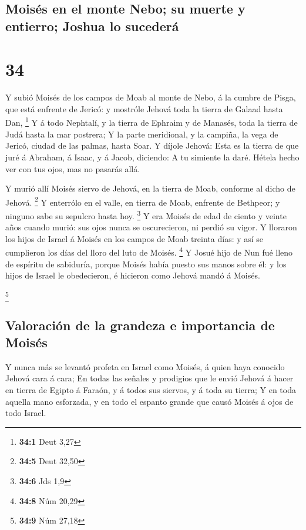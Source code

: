 \hypertarget{moisuxe9s-en-el-monte-nebo-su-muerte-y-entierro-joshua-lo-sucederuxe1}{%
\subsection{Moisés en el monte Nebo; su muerte y entierro; Joshua lo
sucederá}\label{moisuxe9s-en-el-monte-nebo-su-muerte-y-entierro-joshua-lo-sucederuxe1}}

\hypertarget{section-33}{%
\section{34}\label{section-33}}

 Y subió Moisés de los campos de Moab al monte de Nebo, á
la cumbre de Pisga, que está enfrente de Jericó: y mostróle Jehová toda
la tierra de Galaad hasta Dan, \footnote{\textbf{34:1} Deut 3,27}
 Y á todo Nephtalí, y la tierra de Ephraim y de Manasés,
toda la tierra de Judá hasta la mar postrera;  Y la parte
meridional, y la campiña, la vega de Jericó, ciudad de las palmas, hasta
Soar.  Y díjole Jehová: Esta es la tierra de que juré á
Abraham, á Isaac, y á Jacob, diciendo: A tu simiente la daré. Hétela
hecho ver con tus ojos, mas no pasarás allá.

 Y murió allí Moisés siervo de Jehová, en la tierra de
Moab, conforme al dicho de Jehová. \footnote{\textbf{34:5} Deut 32,50}
 Y enterrólo en el valle, en tierra de Moab, enfrente de
Bethpeor; y ninguno sabe su sepulcro hasta hoy. \footnote{\textbf{34:6}
  Jds 1,9}  Y era Moisés de edad de ciento y veinte años
cuando murió: sus ojos nunca se oscurecieron, ni perdió su vigor.
 Y lloraron los hijos de Israel á Moisés en los campos de
Moab treinta días: y así se cumplieron los días del lloro del luto de
Moisés. \footnote{\textbf{34:8} Núm 20,29}  Y Josué hijo
de Nun fué lleno de espíritu de sabiduría, porque Moisés había puesto
sus manos sobre él: y los hijos de Israel le obedecieron, é hicieron
como Jehová mandó á Moisés.

\footnote{\textbf{34:9} Núm 27,18}

\hypertarget{valoraciuxf3n-de-la-grandeza-e-importancia-de-moisuxe9s}{%
\subsection{Valoración de la grandeza e importancia de
Moisés}\label{valoraciuxf3n-de-la-grandeza-e-importancia-de-moisuxe9s}}

 Y nunca más se levantó profeta en Israel como Moisés, á
quien haya conocido Jehová cara á cara;  En todas las
señales y prodigios que le envió Jehová á hacer en tierra de Egipto á
Faraón, y á todos sus siervos, y á toda su tierra;  Y en
toda aquella mano esforzada, y en todo el espanto grande que causó
Moisés á ojos de todo Israel.
